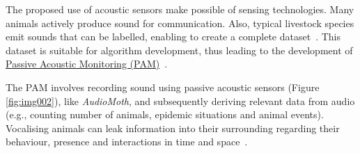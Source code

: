 The proposed use of acoustic sensors make possible of sensing technologies.
Many animals actively produce sound for communication.
Also, typical livestock species emit sounds that can be labelled, enabling to create a complete dataset~\cite{tullo2013precision}.
This dataset is suitable for algorithm development, thus leading to the development of \hyperlink{http://www.sa-instrumentation.com/technology/}{Passive Acoustic Monitoring (PAM)}~\cite{zimmer2011passive}.

The PAM involves recording sound using passive acoustic sensors (Figure \ref{fig:img002}), like \textit{AudioMoth}, and subsequently deriving relevant data from audio (e.g., counting number of animals, epidemic situations and animal events).
Vocalising animals can leak information into their surrounding regarding their behaviour, presence and interactions in time and space~\cite{kershenbaum2016acoustic}.
